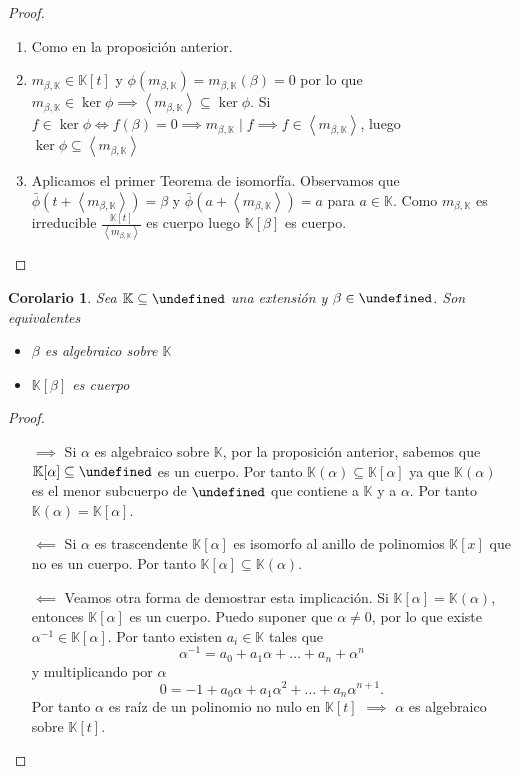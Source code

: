 \documentclass[10pt, spanish]{report}
\newtheorem*{cor}{Corolario}
\theoremstyle{definition}
\newcommand{\K}{\mathbb{K}}
\let\L\undefined
\newcommand{\L}{\mathbb{L}}
\newcommand{\fecha}[1]{\marginpar{\underline{#1}}}
\begin{document}
\begin{proof}\hspace{0pt}
    \begin{enumerate}
        \item Como en la proposición anterior.
        \item $m_{\beta,\K}\in\K[t]$ y $\phi(m_{\beta,\K})=m_{\beta,\K}(\beta)
            =0$ por lo que $m_{\beta,\K}\in \ker{\phi} \implies \left<
            m_{\beta,\K} \right> \subseteq \ker{\phi}$. Si $f\in\ker{\phi}
            \Leftrightarrow f(\beta)=0 \implies m_{\beta,\K}\mid f \implies f\in
            \left< m_{\beta,\K}\right> $, luego $\ker{\phi}\subseteq\left<
            m_{\beta,\K} \right> $
        \item Aplicamos el primer Teorema de isomorfía. Observamos que
            $\bar{\phi}(t+\left< m_{\beta,\K} \right>)=\beta$ y
            $\bar{\phi}(a+\left< m_{\beta,\K} \right>)=a$ para $a\in\K$. Como
            $m_{\beta,\K}$ es irreducible $\frac{\K[t]}{\left< m_{\beta,\K}
            \right> }$ es cuerpo luego $\K[\beta]$ es cuerpo.
    \end{enumerate}
\end{proof}

\begin{cor}
    Sea $\K\subseteq\L$ una extensión y $\beta\in \L$. Son equivalentes
    \begin{itemize}
        \item $\beta$ es algebraico sobre $\K$
        \item $\K[\beta]$ es cuerpo
    \end{itemize}
\end{cor}

\fecha{23/02}
\begin{proof}\hspace{1em}
    \begin{itemize}
        \item[$\implies$]  Si $\alpha$ es algebraico sobre $\K$, por la proposición
            anterior, sabemos que $\K[\alpha]\subseteq\L$ es un cuerpo. Por
            tanto $\K(\alpha)\subseteq\K[\alpha]$ ya que $\K(\alpha)$ es el
            menor subcuerpo de $\L$ que contiene a $\K$ y a $\alpha$. Por tanto
            $\K(\alpha)=\K[\alpha]$.
        \item[$\impliedby$]  Si $\alpha$ es trascendente $\K[\alpha]$ es
            isomorfo al anillo de polinomios $\K[x]$ que no es un cuerpo. Por
            tanto $\K[\alpha]\subseteq\K(\alpha)$.
        \item[$\impliedby$] Veamos otra forma de demostrar esta implicación. Si
            $\K[\alpha]=\K(\alpha)$, entonces $\K[\alpha]$ es un cuerpo. Puedo
            suponer que $\alpha\neq0$, por lo que existe $\alpha^{-1}\in
            \K[\alpha]$. Por tanto existen $a_i\in \K$ tales que
            \[\alpha^{-1}=a_0+a_1\alpha+\ldots+a_n+\alpha^n\] y multiplicando
            por $\alpha$ \[0=-1+a_0\alpha+a_1\alpha^2+\ldots+a_n\alpha^{n+1}.\]
            Por tanto $\alpha$ es raíz de un polinomio no nulo en $\K[t]$
            $\implies$
            $\alpha$ es algebraico sobre $\K[t]$.
    \end{itemize}
\end{proof}
\end{document}
